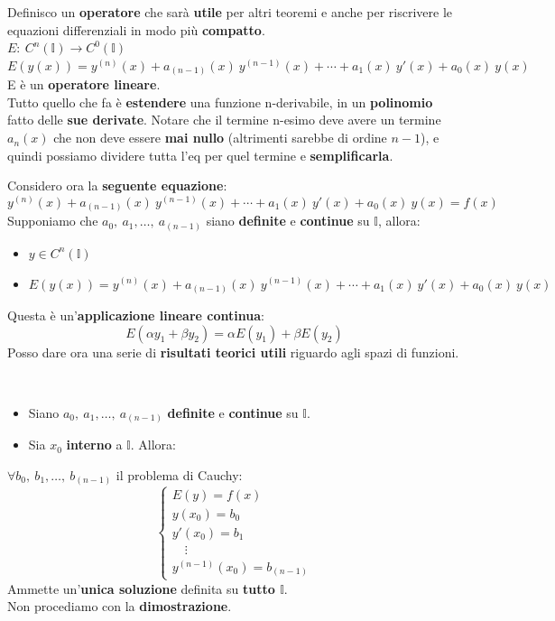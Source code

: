 \documentclass[a4paper, oneside]{article}
\newcommand\I{\mathbb{I}}
\begin{document}
    \begin{definition}
        Definisco un \textbf{operatore} che sarà \textbf{utile} per altri teoremi e anche per riscrivere le equazioni differenziali in modo più \textbf{compatto}.\\
        $E: \ C^n(\I)\to C^0(\I)$\\
        $E\left(y(x)\right) = y^{(n)}(x) + a_{(n-1)}(x) \ y^{(n-1)}(x) + \cdots + a_1(x) \ y'(x) + a_0(x) \ y(x)$\\
        E è un \textbf{operatore lineare}.\\
        Tutto quello che fa è \textbf{estendere} una funzione n-derivabile, in un \textbf{polinomio} fatto delle \textbf{sue derivate}. Notare che il termine n-esimo deve avere un termine $a_n(x)$ che non deve essere \textbf{mai nullo} (altrimenti sarebbe di ordine $n-1$), e quindi possiamo dividere tutta l'eq per quel termine e \textbf{semplificarla}.
    \end{definition}
        \noindent Considero ora la \textbf{seguente equazione}:
        \[y^{(n)}(x) + a_{(n-1)}(x) \ y^{(n-1)}(x) + \cdots + a_1(x) \ y'(x) + a_0(x) \ y(x) = f(x) \]
        Supponiamo che $a_0, \ a_1, \dots, \ a_{(n-1)}$ siano \textbf{definite} e \textbf{continue} su $\I$, allora:
        \begin{itemize}
            \item $y\in C^n(\I)$
            \item $E\left(y(x)\right) = y^{(n)}(x) + a_{(n-1)}(x) \ y^{(n-1)}(x) + \cdots + a_1(x) \ y'(x) + a_0(x) \ y(x)$
        \end{itemize}
        Questa è un'\textbf{applicazione lineare continua}:
        \[E\left(\alpha y_1 + \beta y_2\right) = \alpha E(y_1) + \beta E(y_2)\]
        Posso dare ora una serie di \textbf{risultati teorici utili} riguardo agli spazi di funzioni.

        \begin{theorem}\hfil\\
            \begin{itemize}
                \item Siano $a_0, \ a_1,\dots, \ a_{(n-1)}$ \textbf{definite} e \textbf{continue} su $\I$. 
                \item Sia $x_0$ \textbf{interno} a $\I$. Allora:
            \end{itemize}
            $\forall b_0, \ b_1,\dots, \ b_{(n-1)}$ il problema di Cauchy:
            \[\begin{cases}
                E(y) = f(x) \\
                y(x_0) = b_0 \\
                y'(x_0) = b_1 \\
                \quad\vdots \\
                y^{(n-1)}(x_0) = b_{(n-1)}
            \end{cases}\]
            Ammette un'\textbf{unica soluzione} definita su \textbf{tutto $\I$}. \\
            Non procediamo con la \textbf{dimostrazione}.
        \end{theorem}
\end{document}
